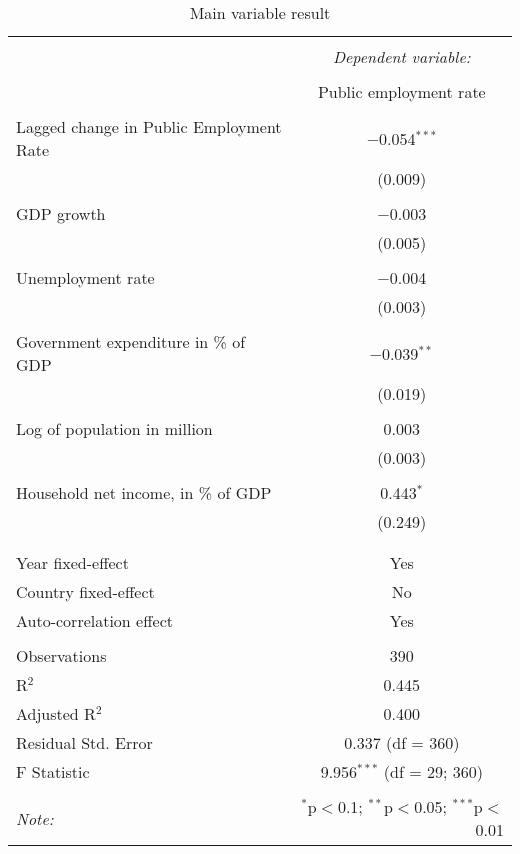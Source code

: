 
\begin{table}[!htbp] \centering 
  \caption{Main variable result} 
  \label{} 
\begin{tabular}{@{\extracolsep{5pt}}lc} 
\\[-1.8ex]\hline 
\hline \\[-1.8ex] 
 & \multicolumn{1}{c}{\textit{Dependent variable:}} \\ 
\cline{2-2} 
\\[-1.8ex] & Public employment rate \\ 
\hline \\[-1.8ex] 
 Lagged change in Public Employment Rate & $-$0.054$^{***}$ \\ 
  & (0.009) \\ 
  & \\ 
 GDP growth & $-$0.003 \\ 
  & (0.005) \\ 
  & \\ 
 Unemployment rate & $-$0.004 \\ 
  & (0.003) \\ 
  & \\ 
 Government expenditure in \% of GDP & $-$0.039$^{**}$ \\ 
  & (0.019) \\ 
  & \\ 
 Log of population in million & 0.003 \\ 
  & (0.003) \\ 
  & \\ 
 Household net income, in \% of GDP & 0.443$^{*}$ \\ 
  & (0.249) \\ 
  & \\ 
\hline \\[-1.8ex] 
Year fixed-effect & Yes \\ 
Country fixed-effect & No \\ 
Auto-correlation effect & Yes \\ 
\hline \\[-1.8ex] 
Observations & 390 \\ 
R$^{2}$ & 0.445 \\ 
Adjusted R$^{2}$ & 0.400 \\ 
Residual Std. Error & 0.337 (df = 360) \\ 
F Statistic & 9.956$^{***}$ (df = 29; 360) \\ 
\hline 
\hline \\[-1.8ex] 
\textit{Note:}  & \multicolumn{1}{r}{$^{*}$p$<$0.1; $^{**}$p$<$0.05; $^{***}$p$<$0.01} \\ 
\end{tabular} 
\end{table} 

